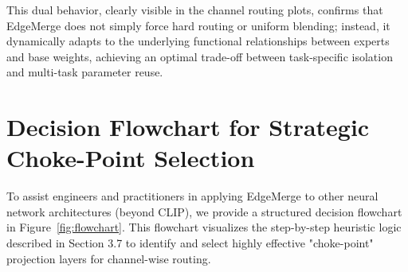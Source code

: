 \documentclass{article}
\theoremstyle{plain}
\theoremstyle{definition}
\theoremstyle{remark}
\begin{document}
This dual behavior, clearly visible in the channel routing plots, confirms that EdgeMerge does not simply force hard routing or uniform blending; instead, it dynamically adapts to the underlying functional relationships between experts and base weights, achieving an optimal trade-off between task-specific isolation and multi-task parameter reuse.

\section{Decision Flowchart for Strategic Choke-Point Selection}
\label{app:flowchart}

To assist engineers and practitioners in applying EdgeMerge to other neural network architectures (beyond CLIP), we provide a structured decision flowchart in Figure~\ref{fig:flowchart}. This flowchart visualizes the step-by-step heuristic logic described in Section 3.7 to identify and select highly effective "choke-point" projection layers for channel-wise routing.
\end{document}
